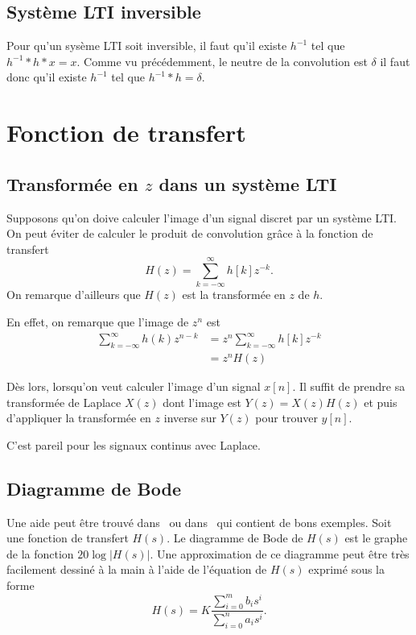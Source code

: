 \subsection{Système LTI inversible}
Pour qu'un sysème LTI soit inversible, il faut qu'il existe $h^{-1}$ tel que
$h^{-1}*h*x = x$.
Comme vu précédemment, le neutre de la convolution est $\delta$ il faut donc
qu'il existe $h^{-1}$ tel que $h^{-1} * h = \delta$.


\section{Fonction de transfert}
\subsection{Transformée en $z$ dans un système LTI}
Supposons qu'on doive calculer l'image d'un signal discret par un système LTI.
On peut éviter de calculer le produit de convolution grâce à la fonction
de transfert
\[ H(z) = \sum_{k=-\infty}^{\infty} h[k] z^{-k}. \]
On remarque d'ailleurs que $H(z)$ est la transformée en $z$ de $h$.

En effet, on remarque que l'image de $z^n$ est
\begin{align*}
  \sum_{k=-\infty}^{\infty} h(k) z^{n-k} &
  = z^{n} \sum_{k=-\infty}^{\infty} h[k] z^{-k}\\
  & = z^n H(z)
\end{align*}

Dès lors, lorsqu'on veut calculer l'image d'un signal $x[n]$. Il suffit de
prendre sa transformée de Laplace $X(z)$ dont l'image est $Y(z) = X(z) H(z)$
et puis d'appliquer la transformée en $z$ inverse sur $Y(z)$ pour trouver
$y[n]$.

C'est pareil pour les signaux continus avec Laplace.

\subsection{Diagramme de Bode}
Une aide peut être trouvé dans~\cite[pp.~251-253]{astrom2010feedback} ou dans~\cite{cheever2013bode} qui contient de bons exemples.
Soit une fonction de transfert $H(s)$.
Le diagramme de Bode de $H(s)$ est le graphe de la fonction $20\log|H(s)|$.
Une approximation de ce diagramme peut être très facilement dessiné à la main
à l'aide de l'équation de $H(s)$ exprimé sous la forme
\[ H(s) = K \frac{\sum_{i=0}^mb_is^i}{\sum_{i=0}^na_is^i}. \]

